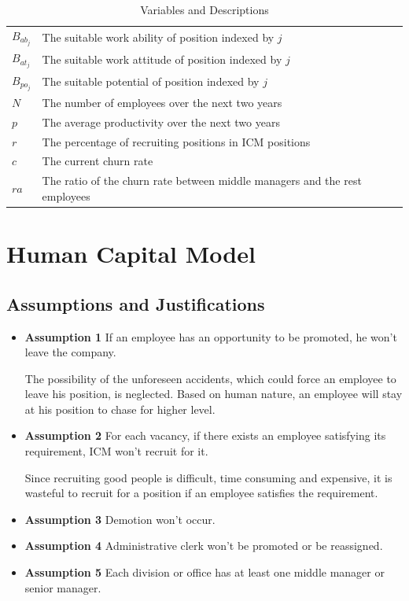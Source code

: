\documentclass[12pt,a4paper,titlepage]{article}
\begin{document}
\begin{table}
\begin{tabular}{l p{10cm}}
  $B_{ab_j}$       &The suitable work ability of position indexed by
                     $j$ \\
  $B_{at_j}$       &The suitable work attitude of position indexed by
                     $j$ \\
  $B_{po_j}$       &The suitable potential of position indexed by $j$
                     \\
  $N$ & The number of employees over the next two years \\
$p$ & The average productivity over the next two years \\
$r$ & The percentage of recruiting positions in ICM positions \\
$c$ & The current churn rate \\
$ra$ & The ratio of the churn rate between middle managers and the
       rest employees \\
  \bottomrule[2pt]
\end{tabular}
\caption{Variables and Descriptions}\label{variable1}
\end{table}

\section{Human Capital Model}
\label{sec:human-capital-model}

\subsection{Assumptions and Justifications}
\label{sec:assumptions-and-justifications}

\begin{itemize}
\item \textbf{Assumption 1} If an employee has an opportunity to be promoted, he won't leave the company.

The possibility of the unforeseen accidents, which could force an
employee to leave his position, is neglected. Based on human nature,
an employee will stay at his position to chase for higher level.

\item \textbf{Assumption 2} For each vacancy, if there exists an
  employee satisfying its requirement, ICM won't recruit for it.

Since recruiting good people is difficult, time consuming and
expensive, it is wasteful to recruit for a
position if an employee satisfies the requirement.

\item \textbf{Assumption 3} Demotion won't occur.

\item \textbf{Assumption 4} Administrative clerk won't be promoted or be
  reassigned.

\item \textbf{Assumption 5} Each division or office has at least one
  middle manager or senior manager.

\end{itemize}
\end{document}

